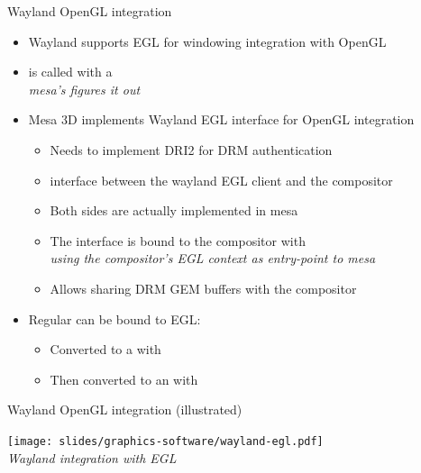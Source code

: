 \begin{frame}{Wayland OpenGL integration}
  \begin{itemize}
    \item Wayland supports EGL for windowing integration with OpenGL
    \item {} is called with a \\
      \textit{mesa's  figures it out}
    \item Mesa 3D implements Wayland EGL interface for OpenGL integration
      \begin{itemize}
      \item Needs to implement DRI2 for DRM authentication
      \item {} interface between the wayland EGL client and the compositor
      \item Both sides are actually implemented in mesa
      \item The interface is bound to the compositor with \\
        \textit{using the compositor's EGL context as entry-point to mesa}
      \item Allows sharing DRM GEM buffers with the compositor
      \end{itemize}
    \item Regular  can be bound to EGL:
      \begin{itemize}
      \item Converted to a  with 
      \item Then converted to an  with 
      \end{itemize}
    \end{itemize}
\end{frame}

\begin{frame}{Wayland OpenGL integration (illustrated)}
  \begin{center}
  \texttt{[image: slides/graphics-software/wayland-egl.pdf]}\\
  \textit{\small Wayland integration with EGL}\\
  \end{center}
\end{frame}

